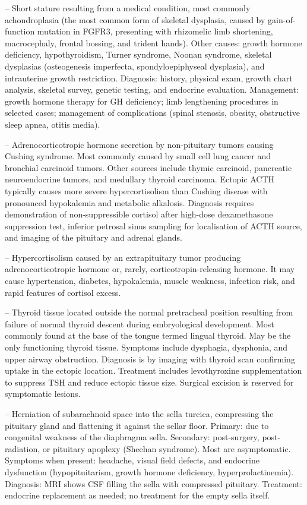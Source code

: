 -- Short stature resulting from a medical condition, most commonly achondroplasia (the most common form of skeletal dysplasia, caused by gain-of-function mutation in FGFR3, presenting with rhizomelic limb shortening, macrocephaly, frontal bossing, and trident hands). Other causes: growth hormone deficiency, hypothyroidism, Turner syndrome, Noonan syndrome, skeletal dysplasias (osteogenesis imperfecta, spondyloepiphyseal dysplasia), and intrauterine growth restriction. Diagnosis: history, physical exam, growth chart analysis, skeletal survey, genetic testing, and endocrine evaluation. Management: growth hormone therapy for GH deficiency; limb lengthening procedures in selected cases; management of complications (spinal stenosis, obesity, obstructive sleep apnea, otitis media).

-- Adrenocorticotropic hormone secretion by non-pituitary tumors causing Cushing syndrome. Most commonly caused by small cell lung cancer and bronchial carcinoid tumors. Other sources include thymic carcinoid, pancreatic neuroendocrine tumors, and medullary thyroid carcinoma. Ectopic ACTH typically causes more severe hypercortisolism than Cushing disease with pronounced hypokalemia and metabolic alkalosis. Diagnosis requires demonstration of non-suppressible cortisol after high-dose dexamethasone suppression test, inferior petrosal sinus sampling for localisation of ACTH source, and imaging of the pituitary and adrenal glands.

-- Hypercortisolism caused by an extrapituitary tumor producing adrenocorticotropic hormone or, rarely, corticotropin-releasing hormone. It may cause hypertension, diabetes, hypokalemia, muscle weakness, infection risk, and rapid features of cortisol excess.

-- Thyroid tissue located outside the normal pretracheal position resulting from failure of normal thyroid descent during embryological development. Most commonly found at the base of the tongue termed lingual thyroid. May be the only functioning thyroid tissue. Symptoms include dysphagia, dysphonia, and upper airway obstruction. Diagnosis is by imaging with thyroid scan confirming uptake in the ectopic location. Treatment includes levothyroxine supplementation to suppress TSH and reduce ectopic tissue size. Surgical excision is reserved for symptomatic lesions.

-- Herniation of subarachnoid space into the sella turcica, compressing the pituitary gland and flattening it against the sellar floor. Primary: due to congenital weakness of the diaphragma sella. Secondary: post-surgery, post-radiation, or pituitary apoplexy (Sheehan syndrome). Most are asymptomatic. Symptoms when present: headache, visual field defects, and endocrine dysfunction (hypopituitarism, growth hormone deficiency, hyperprolactinemia). Diagnosis: MRI shows CSF filling the sella with compressed pituitary. Treatment: endocrine replacement as needed; no treatment for the empty sella itself.

